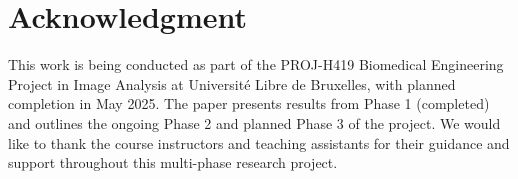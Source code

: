 \section*{Acknowledgment}
This work is being conducted as part of the PROJ-H419 Biomedical Engineering Project in Image Analysis at Université Libre de Bruxelles, with planned completion in May 2025. The paper presents results from Phase 1 (completed) and outlines the ongoing Phase 2 and planned Phase 3 of the project. We would like to thank the course instructors and teaching assistants for their guidance and support throughout this multi-phase research project.
